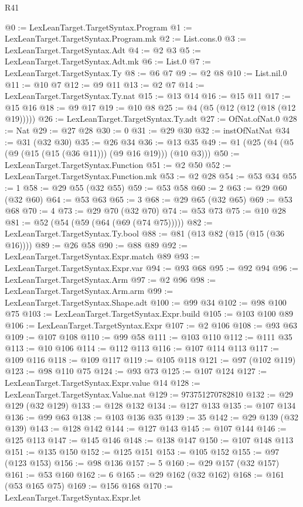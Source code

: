 \begin{lexlean}{R41}
\begin{coremodule}
@0 := LexLeanTarget.TargetSyntax.Program
@1 := LexLeanTarget.TargetSyntax.Program.mk
@2 := List.cons.{0}
@3 := LexLeanTarget.TargetSyntax.Adt
@4 := @2 @3
@5 := LexLeanTarget.TargetSyntax.Adt.mk
@6 := List.{0}
@7 := LexLeanTarget.TargetSyntax.Ty
@8 := @6 @7
@9 := @2 @8
@10 := List.nil.{0}
@11 := @10 @7
@12 := @9 @11
@13 := @2 @7
@14 := LexLeanTarget.TargetSyntax.Ty.nat
@15 := @13 @14
@16 := @15 @11
@17 := @15 @16
@18 := @9 @17
@19 := @10 @8
@25 := @4 (@5 (@12 (@12 (@18 (@12 @19)))))
@26 := LexLeanTarget.TargetSyntax.Ty.adt
@27 := OfNat.ofNat.{0}
@28 := Nat
@29 := @27 @28
@30 := 0
@31 := @29 @30
@32 := instOfNatNat
@34 := @31 (@32 @30)
@35 := @26 @34
@36 := @13 @35
@49 := @1 (@25 (@4 (@5 (@9 (@15 (@15 (@36 @11))) (@9 @16 @19))) (@10 @3)))
@50 := LexLeanTarget.TargetSyntax.Function
@51 := @2 @50
@52 := LexLeanTarget.TargetSyntax.Function.mk
@53 := @2 @28
@54 := @53 @34
@55 := 1
@58 := @29 @55 (@32 @55)
@59 := @53 @58
@60 := 2
@63 := @29 @60 (@32 @60)
@64 := @53 @63
@65 := 3
@68 := @29 @65 (@32 @65)
@69 := @53 @68
@70 := 4
@73 := @29 @70 (@32 @70)
@74 := @53 @73
@75 := @10 @28
@81 := @52 (@54 (@59 (@64 (@69 (@74 @75)))))
@82 := LexLeanTarget.TargetSyntax.Ty.bool
@88 := @81 (@13 @82 (@15 (@15 (@36 @16))))
@89 := @26 @58
@90 := @88 @89
@92 := LexLeanTarget.TargetSyntax.Expr.match @89
@93 := LexLeanTarget.TargetSyntax.Expr.var
@94 := @93 @68
@95 := @92 @94
@96 := LexLeanTarget.TargetSyntax.Arm
@97 := @2 @96
@98 := LexLeanTarget.TargetSyntax.Arm.arm
@99 := LexLeanTarget.TargetSyntax.Shape.adt
@100 := @99 @34
@102 := @98 @100 @75
@103 := LexLeanTarget.TargetSyntax.Expr.build
@105 := @103 @100 @89
@106 := LexLeanTarget.TargetSyntax.Expr
@107 := @2 @106
@108 := @93 @63
@109 := @107 @108
@110 := @99 @58
@111 := @103 @110
@112 := @111 @35
@113 := @10 @106
@114 := @112 @113
@116 := @107 @114 @113
@117 := @109 @116
@118 := @109 @117
@119 := @105 @118
@121 := @97 (@102 @119)
@123 := @98 @110 @75
@124 := @93 @73
@125 := @107 @124
@127 := LexLeanTarget.TargetSyntax.Expr.value @14
@128 := LexLeanTarget.TargetSyntax.Value.nat
@129 := 973751270782810
@132 := @29 @129 (@32 @129)
@133 := @128 @132
@134 := @127 @133
@135 := @107 @134
@136 := @99 @63
@138 := @103 @136 @35
@139 := 35
@142 := @29 @139 (@32 @139)
@143 := @128 @142
@144 := @127 @143
@145 := @107 @144
@146 := @125 @113
@147 := @145 @146
@148 := @138 @147
@150 := @107 @148 @113
@151 := @135 @150
@152 := @125 @151
@153 := @105 @152
@155 := @97 (@123 @153)
@156 := @98 @136
@157 := 5
@160 := @29 @157 (@32 @157)
@161 := @53 @160
@162 := 6
@165 := @29 @162 (@32 @162)
@168 := @161 (@53 @165 @75)
@169 := @156 @168
@170 := LexLeanTarget.TargetSyntax.Expr.let

\end{coremodule}
\end{lexlean}
